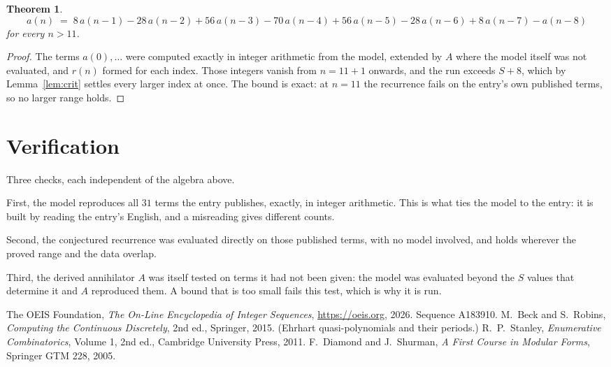 \documentclass[11pt,a4paper]{article}
\theoremstyle{plain}
\newtheorem{theorem}{Theorem}
\theoremstyle{definition}
\begin{document}
\begin{theorem}
\[
a(n)\;=\;8\,a(n-1) - 28\,a(n-2) + 56\,a(n-3) - 70\,a(n-4) + 56\,a(n-5) - 28\,a(n-6) + 8\,a(n-7) - a(n-8)
\]
for every $n>11$.
\end{theorem}

\begin{proof}
The terms $a(0),\dots$ were computed exactly in integer arithmetic from the model, extended by
$A$ where the model itself was not evaluated, and $r(n)$ formed for each index. Those integers
vanish from $n=11+1$ onwards, and the run exceeds $S+8$, which by
Lemma~\ref{lem:crit} settles every larger index at once. The bound is exact: at $n=11$ the recurrence fails on the entry's own published terms, so no larger range holds.
\end{proof}

\section{Verification}

Three checks, each independent of the algebra above.

First, the model reproduces all $31$ terms the entry publishes, exactly, in integer
arithmetic. This is what ties the model to the entry: it is built by reading the entry's
English, and a misreading gives different counts.

Second, the conjectured recurrence was evaluated directly on those published terms, with no
model involved, and holds wherever the proved range and the data overlap.

Third, the derived annihilator $A$ was itself tested on terms it had not been given: the model
was evaluated beyond the $S$ values that determine it and $A$ reproduced them. A bound that is
too small fails this test, which is why it is run.

\begin{thebibliography}{9}
 The OEIS Foundation, \emph{The On-Line Encyclopedia of Integer
Sequences}, \url{https://oeis.org}, 2026. Sequence A183910.
 M.~Beck and S.~Robins, \emph{Computing the Continuous Discretely},
2nd ed., Springer, 2015. (Ehrhart quasi-polynomials and their periods.)
 R.~P.~Stanley, \emph{Enumerative Combinatorics}, Volume 1, 2nd ed.,
Cambridge University Press, 2011.
 F.~Diamond and J.~Shurman, \emph{A First Course in Modular Forms},
Springer GTM 228, 2005.
\end{thebibliography}
\end{document}
